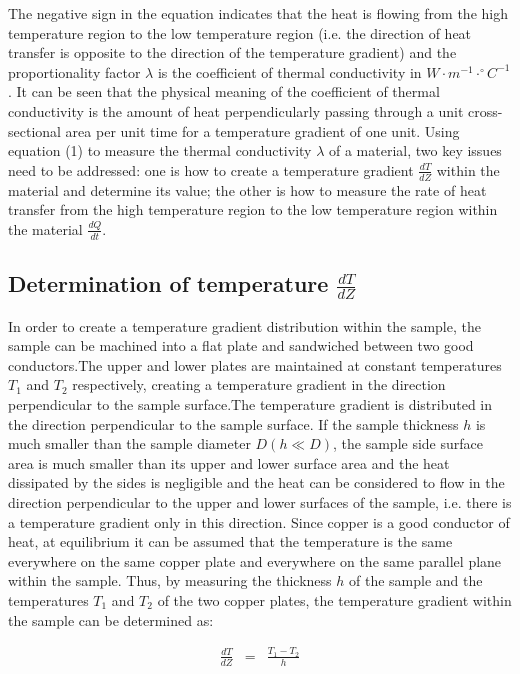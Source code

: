 \documentclass[UTF8]{article}
\begin{document}
    The negative sign in the equation indicates that the heat is flowing from the high temperature region to the low temperature region (i.e. the direction of heat transfer is opposite to the direction of the temperature gradient) and the proportionality factor $\lambda $ is the coefficient of thermal conductivity in $W\cdot m^{-1}\cdot ^{\circ}C^{-1} $. It can be seen that the physical meaning of the coefficient of thermal conductivity is the amount of heat perpendicularly passing through a unit cross-sectional area per unit time for a temperature gradient of one unit. Using equation (1) to measure the thermal conductivity $\lambda $ of a material, two key issues need to be addressed: one is how to create a temperature gradient $\frac{dT}{dZ}$ within the material and determine its value; the other is how to measure the rate of heat transfer from the high temperature region to the low temperature region within the material $\frac{dQ}{dt} $.
    
	\subsection{Determination of temperature $\frac{dT}{dZ}$}
    In order to create a temperature gradient distribution within the sample, the sample can be machined into a flat plate and sandwiched between two good conductors.The upper and lower plates are maintained at constant temperatures $T_{1}$ and $T_{2}$ respectively, creating a temperature gradient in the direction perpendicular to the sample surface.The temperature gradient is distributed in the direction perpendicular to the sample surface. If the sample thickness $h$ is much smaller than the sample diameter $D\left (h\ll D  \right ) $, the sample side surface area is much smaller than its upper and lower surface area and the heat dissipated by the sides is negligible and the heat can be considered to flow in the direction perpendicular to the upper and lower surfaces of the sample, i.e. there is a temperature gradient only in this direction. Since copper is a good conductor of heat, at equilibrium it can be assumed that the temperature is the same everywhere on the same copper plate and everywhere on the same parallel plane within the sample. Thus, by measuring the thickness $h$ of the sample and the temperatures $T_{1}$ and $T_{2}$ of the two copper plates, the temperature gradient within the sample can be determined as:
    
    \begin{eqnarray}\frac{dT}{dZ} & = & \frac{T_{1}-T_{2}  }{h} \end{eqnarray}
    
\end{document}
